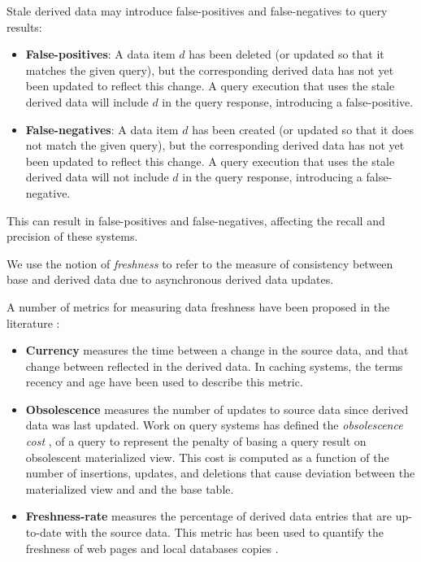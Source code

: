 Stale derived data may introduce false-positives and false-negatives to query results:
\begin{itemize}
  \item \textbf{False-positives}: A data item $d$ has been deleted (or updated so that it matches the given query),
  but the corresponding derived data has not yet been updated to reflect this change.
  A query execution that uses the stale derived data will include $d$ in the query response, introducing a false-positive.

  \item \textbf{False-negatives}: A data item $d$ has been created (or updated so that it does not match the given query),
  but the corresponding derived data has not yet been updated to reflect this change.
  A query execution that uses the stale derived data will not include $d$ in the query response,
  introducing a false-negative.
\end{itemize}
This can result in false-positives and false-negatives, affecting the recall and precision of these systems.

We use the notion of \textit{freshness} to refer to the measure of consistency between base and derived data due to
asynchronous derived data updates.

A number of metrics for measuring data freshness have been proposed in the literature \cite{bouzeghoub:datafreshness}:
\begin{itemize}
  \item \textbf{Currency} measures the time between a change in the source data, and that change between reflected in
  the derived data.
  In caching systems, the terms recency \cite{bright:latencyrecency} and age \cite{cho:dbfreshness}
  have been used to describe this metric.
  \item \textbf{Obsolescence} measures the number of updates to source data since derived data was last updated.
  Work on query systems has defined the \textit{obsolescence cost} \cite{avigdor:obsolescent}, of a query to represent
  the penalty of basing a query result on obsolescent materialized view.
  This cost is computed as a function of the number of insertions, updates, and deletions that cause deviation between
  the materialized view and and the base table.
  \item \textbf{Freshness-rate} measures the percentage of derived data entries that are up-to-date with the source
  data.
  This metric has been used to quantify the freshness of web pages \cite{labrinidis:balancingperfomancefreshness} and
  local databases copies \cite{cho:dbfreshness}.
\end{itemize}

